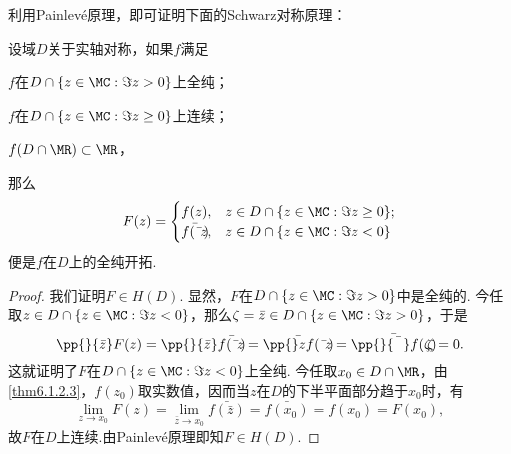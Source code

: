 利用Painlev\'e原理，即可证明下面的Schwarz对称原理：
\begin{theorem}\label{thm6.1.2}
设域$D$关于实轴对称，如果$f$满足
\begin{eenum}
  \item \label{thm6.1.2.1} $f$在$D\cap\{z\in\MC:\Im z>0\}$上全纯；
  \item \label{thm6.1.2.2} $f$在$D\cap\{z\in\MC:\Im z\ge0\}$上连续；
  \item \label{thm6.1.2.3} $f(D\cap\MR)\subset\MR$，
\end{eenum}
那么
\[F(z)=\begin{cases}
f(z),&z\in D\cap\{z\in \MC:\Im z\ge0\};\\
\bar{f(\bar z)},&z\in D\cap \{z\in\MC:\Im z<0\}
\end{cases}\]
便是$f$在$D$上的全纯开拓.
\end{theorem}
\begin{proof}
我们证明$F\in H(D)$. 显然，$F$在$D\cap\{z\in\MC:\Im z>0\}$中是全纯的. 今任取$z\in D\cap\{z\in\MC:\Im z<0\}$，那么$\zeta=\bar z\in D\cap\{z\in\MC:\Im z>0\}$，于是
\[\pp{}{\bar z}F(z)=\pp{}{\bar z}\bar{f(\bar z)}=\bar{\pp{}zf(\bar z)}
=\bar{\pp{}{\bar\zeta}f(\zeta)}=0.\]
这就证明了$F$在$D\cap\{z\in\MC:\Im z<0\}$上全纯. 今任取$x_0\in D\cap\MR$，由 \ref{thm6.1.2.3}，$f(z_0)$取实数值，因而当$z$在$D$的下半平面部分趋于$x_0$时，有
\[\lim_{z\to x_0}F(z)=\lim_{\bar z\to x_0}\bar{f(\bar z)}=\bar{f(x_0)}
=f(x_0)=F(x_0),\]
故$F$在$D$上连续.由Painlev\'e原理即知$F\in H(D)$.
\end{proof}

